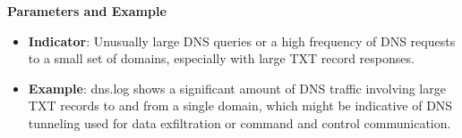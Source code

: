 \noindent \textbf{Parameters and Example}
\begin{itemize}
    \item \textbf{Indicator}: Unusually large DNS queries or a high frequency of DNS requests to a small set of domains, especially with large TXT record responses.
    \item \textbf{Example}: dns.log shows a significant amount of DNS traffic involving large TXT records to and from a single domain, which might be indicative of DNS tunneling used for data exfiltration or command and control communication.
\end{itemize}
